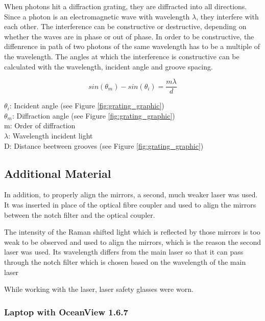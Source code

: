 \bigskip


When photons hit a diffraction grating, they are diffracted into all directions. Since a photon is an electromagnetic wave with wavelength \(\lambda\), they interfere with each other. The interference can be constructive or destructive, depending on whether the waves are in phase or out of phase. In order to be constructive, the diffenrence in path of two photons of the same wavelength has to be a multiple of the wavelength. The angles at which the interference is constructive can be calculated with the wavelength, incident angle and groove spacing.


\begin{equation}
     sin(\theta_m)-sin(\theta_i)=\frac{m \lambda}{d}
 \end{equation}

\(\theta_i\): Incident angle (see Figure \ref{fig:grating_graphic})\\
\(\theta_m\): Diffraction angle (see Figure \ref{fig:grating_graphic})\\
m: Order of diffraction\\
\(\lambda\): Wavelength incident light\\
D: Distance beetween grooves (see Figure \ref{fig:grating_graphic})

\newpage

\subsection{Additional Material}

In addition, to properly align the mirrors, a second, much weaker laser was used. It was inserted in place of the optical fibre coupler and used to align the mirrors between the notch filter and the optical coupler. 

\bigskip

The intensity of the Raman shifted light which is reflected by those mirrors is too weak to be observed and used to align the mirrors, which is the reason the second laser was used. Its wavelength differs from the main laser so that it can pass through the notch filter which is chosen based on the wavelength of the main laser
\bigskip

While working with the laser, laser safety glasses were worn. 

\subsubsection{Laptop with OceanView 1.6.7}

